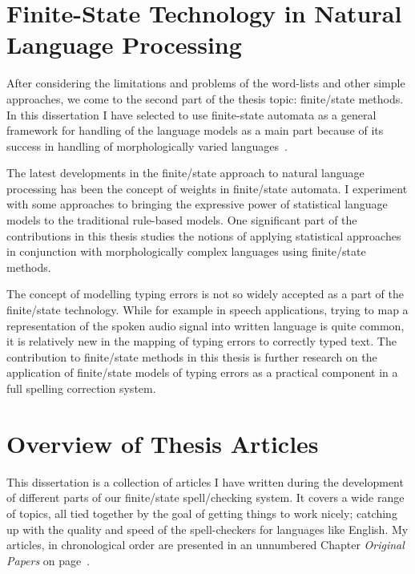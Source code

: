 \documentclass[officiallayout]{unihelcompling}
\begin{document}
\section{Finite-State Technology in Natural Language Processing}
\label{sec:finite-state-technology-in-nlp}

After considering the limitations and problems of the word-lists and other
simple approaches, we come to the second part of the thesis topic: finite\-/state
methods. In this dissertation I have selected to use finite-state automata
as a general framework for handling of the language models as a main part
because of its success in handling of morphologically varied 
languages~\cite{beesley2003finite}.

The latest developments in the finite\-/state approach to natural language
processing has been the concept of weights in finite\-/state automata.  I
experiment with some approaches to bringing the expressive power of
statistical language models to the traditional rule-based models. One
significant part of the contributions in this thesis studies the notions of
applying statistical approaches in conjunction with morphologically complex
languages using finite\-/state methods.

The concept of modelling typing errors is not so widely accepted as a part of
the finite\-/state technology. While for example in speech applications,
trying to map a representation of the spoken audio signal into written language
is quite common, it is relatively new in the mapping of typing errors to
correctly typed text. The contribution to finite\-/state methods in this thesis
is further research on the application of finite\-/state models of typing errors
as a practical component in a full spelling correction system.


\section{Overview of Thesis Articles}
\label{sec:articles}

This dissertation is a collection of articles I have written during the
development of different parts of our finite\-/state spell\-/checking system. It
covers a wide range of topics, all tied together by the goal of getting things
to work nicely; catching up with the quality and speed of the spell-checkers
for languages like English. My articles, in chronological order are presented
in an unnumbered Chapter \emph{Original Papers} on page~\pageref{chap:papers}.
\end{document}
